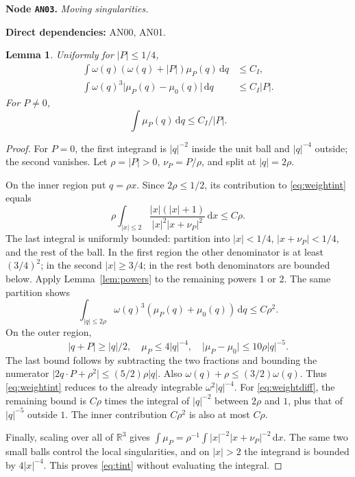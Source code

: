 \documentclass[11pt,a4paper]{article}
\newtheorem{lemma}[theorem]{Lemma}
\theoremstyle{remark}\newtheorem{remark}[theorem]{Remark}
\newcommand{\R}{\mathbb R}\newcommand{\C}{\mathbb C}\newcommand{\N}{\mathbb N}
\newcommand{\abs}[1]{\lvert #1\rvert}\newcommand{\rankone}[2]{\lvert #1\rangle\langle #2\rvert}
\newcommand{\dd}{\,\mathrm d}\newcommand{\almosteverywhere}{\text{a.e.}}
\newcommand{\node}[3]{\par\Needspace{6\baselineskip}\smallskip\hypertarget{node:#1}{}\label{nodepage:#1}\noindent\textbf{Node \texttt{#1}.} \textit{#2.}\par\noindent\textbf{Direct dependencies:} #3.\par}
\begin{document}
\node{AN03}{Moving singularities}{AN00, AN01}
\begin{lemma}\label{lem:singular}
Uniformly for $\abs P\leq1/4$,
\begin{align}
 \int\omega(q)(\omega(q)+\abs P)\mu_P(q)\dd q&\leq C_I,\label{eq:weightint}\\
 \int\omega(q)^3\abs{\mu_P(q)-\mu_0(q)}\dd q&\leq C_I\abs P.\label{eq:weightdiff}
\end{align}
For $P\ne0$,
\begin{equation}
 \int\mu_P(q)\dd q\leq C_I/\abs P.\label{eq:tint}
\end{equation}
\end{lemma}
\begin{proof}
For $P=0$, the first integrand is $\abs q^{-2}$ inside the unit ball and $\abs q^{-4}$ outside; the second vanishes. Let $\rho=\abs P>0$, $\nu_P=P/\rho$, and split at $\abs q=2\rho$.

On the inner region put $q=\rho x$. Since $2\rho\leq1/2$, its contribution to \eqref{eq:weightint} equals
\[
 \rho\int_{\abs x\leq2}\frac{\abs x(\abs x+1)}{\abs x^2\abs{x+\nu_P}^2}\dd x\leq C\rho.
\]
The last integral is uniformly bounded: partition into $\abs x<1/4$, $\abs{x+\nu_P}<1/4$, and the rest of the ball. In the first region the other denominator is at least $(3/4)^2$; in the second $\abs x\geq3/4$; in the rest both denominators are bounded below. Apply Lemma~\ref{lem:powers} to the remaining powers $1$ or $2$. The same partition shows
\[
 \int_{\abs q\leq2\rho}\omega(q)^3(\mu_P(q)+\mu_0(q))\dd q\leq C\rho^2.
\]
On the outer region,
\[
 \abs{q+P}\geq\abs q/2,\quad
 \mu_P\leq4\abs q^{-4},\quad
 \abs{\mu_P-\mu_0}\leq10\rho\abs q^{-5}.
\]
The last bound follows by subtracting the two fractions and bounding the numerator $\abs{2q\cdot P+\rho^2}\leq(5/2)\rho\abs q$. Also $\omega(q)+\rho\leq(3/2)\omega(q)$. Thus \eqref{eq:weightint} reduces to the already integrable $\omega^2\abs q^{-4}$. For \eqref{eq:weightdiff}, the remaining bound is $C\rho$ times the integral of $\abs q^{-2}$ between $2\rho$ and $1$, plus that of $\abs q^{-5}$ outside $1$. The inner contribution $C\rho^2$ is also at most $C\rho$.

Finally, scaling over all of $\R^3$ gives $\int\mu_P=\rho^{-1}\int\abs x^{-2}\abs{x+\nu_P}^{-2}\dd x$. The same two small balls control the local singularities, and on $\abs x>2$ the integrand is bounded by $4\abs x^{-4}$. This proves \eqref{eq:tint} without evaluating the integral.
\end{proof}
\end{document}
